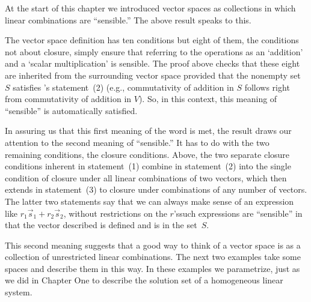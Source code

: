 \begin{remark}
At the start of this chapter we introduced vector spaces as collections in
which linear combinations are ``sensible.''
The above result speaks to this.

The vector space definition has ten conditions but eight of them, the
conditions not about closure, simply ensure that referring to the
operations as an `addition' and a `scalar multiplication' is sensible.
The proof above checks that these eight
are inherited from the
surrounding vector space provided that the nonempty set $S$ satisfies
's statement~(2) 
(e.g., commutativity of addition in $S$ follows right from
commutativity of addition in $V$).
So, in this context, this meaning of ``sensible'' is automatically
satisfied.

In assuring us that this first meaning of the word is met, the result draws
our attention to the second meaning of ``sensible.''
It has to do with the two remaining conditions, the closure conditions.
Above, the two separate closure conditions inherent in statement~(1) 
combine in statement~(2) into the single condition of closure under all
linear combinations of two vectors, which then extends in statement~(3) to
closure under combinations of any number of vectors.
The latter two statements say that we can always make sense of 
an expression like
$r_1\vec{s}_1+r_2\vec{s}_2$, without restrictions on the $r$'s\Dash such 
expressions are ``sensible'' in that the vector described is defined 
and is in the set~$S$.

This second meaning suggests that a good way to think of
a vector space is as a collection of unrestricted linear combinations.
The next two examples take some spaces and describe them in this way.
In these examples we parametrize, just as we did in Chapter One 
to describe the solution set of a homogeneous linear system.
\end{remark}

